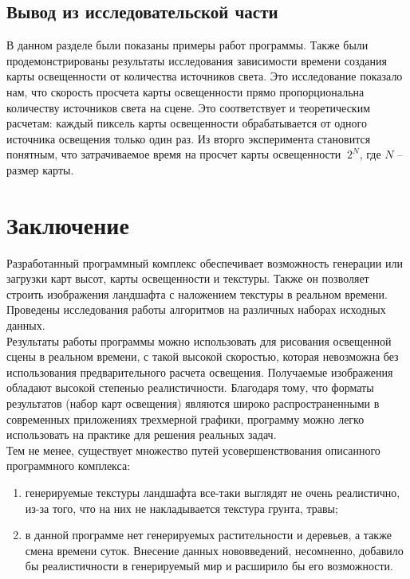 \documentclass[a4paper, 10pt]{article}
\begin{document}
	\subsection{Вывод из исследовательской части}
	\hspace*{5mm} В данном разделе были показаны примеры работ программы. Также были продемонстрированы результаты исследования зависимости времени создания карты освещенности от количества источников света. Это исследование показало нам, что скорость просчета карты освещенности прямо пропорциональна количеству источников света на сцене. Это соответствует и теоретическим расчетам: каждый пиксель карты освещенности обрабатывается от одного источника  освещения только один раз. Из вторго эксперимента становится понятным, что затрачиваемое время на просчет карты освещенности  $~2^N$, где $N$ – размер карты.
	\clearpage

	\section*{Заключение}
	\hspace*{5mm}Разработанный программный комплекс обеспечивает возможность генерации или загрузки карт высот, карты освещенности и текстуры. Также он позволяет строить изображения ландшафта с наложением текстуры в реальном времени. Проведены исследования работы алгоритмов на различных наборах исходных данных. 
	\\ \hspace*{5mm}Результаты работы программы можно использовать для рисования освещенной сцены в реальном времени, с такой высокой скоростью, которая невозможна без использования предварительного расчета освещения. Получаемые изображения обладают высокой степенью реалистичности.
	Благодаря тому, что форматы результатов (набор карт освещения) являются широко  распространенными в современных приложениях трехмерной графики, программу можно легко использовать на практике для решения реальных задач.
	\\ \hspace*{5mm}Тем не менее, существует множество путей усовершенствования описанного программного комплекса:
	\begin{enumerate}
		\item генерируемые текстуры ландшафта все-таки выглядят не очень реалистично, из-за того, что на них не накладывается текстура грунта, травы;
		\item в данной программе нет генерируемых растительности и деревьев, а также смена времени суток.
		Внесение данных нововведений, несомненно, добавило бы реалистичности в генерируемый мир и расширило бы его возможности.
	\end{enumerate} 
	   

\clearpage
\newpage

\printbibliography
{}
\end{document}
